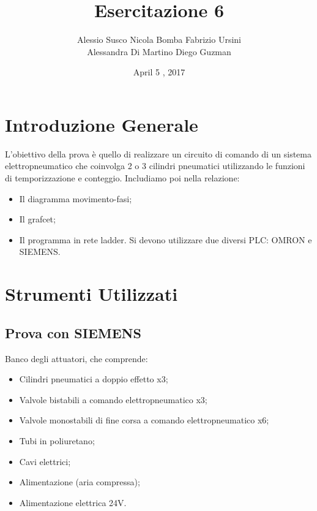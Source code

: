 \documentclass[a4paper]{article}
\begin{document}
\title{Esercitazione 6}
\date{April 5 , 2017}
\maketitle


\author{Alessio Susco \hspace*{2cm} Nicola Bomba \hspace*{2cm} Fabrizio Ursini  \\  \hspace*{1,85cm} Alessandra Di Martino \hspace*{1,25cm} Diego Guzman}

 

\tableofcontents

\clearpage

\section{Introduzione Generale}
L’obiettivo della prova è quello di realizzare un circuito di comando di un sistema elettropneumatico che coinvolga 2 o 3 cilindri pneumatici utilizzando le funzioni di temporizzazione e conteggio. Includiamo poi nella relazione:

\begin{itemize}
\item Il diagramma movimento-fasi;
\item Il grafcet;
\item Il programma in rete ladder.
Si devono utilizzare due diversi PLC: OMRON e SIEMENS.
\end{itemize}

\section{Strumenti Utilizzati}

\subsection{Prova con SIEMENS}
Banco degli attuatori, che comprende:
\begin{itemize}
\item Cilindri pneumatici a doppio effetto x3;
\item Valvole bistabili a comando elettropneumatico x3;
\item Valvole monostabili di fine corsa a comando elettropneumatico x6;
\item Tubi in poliuretano;
\item Cavi elettrici;
\item Alimentazione (aria compressa);
\item Alimentazione elettrica 24V.
\end{itemize}
\end{document}
